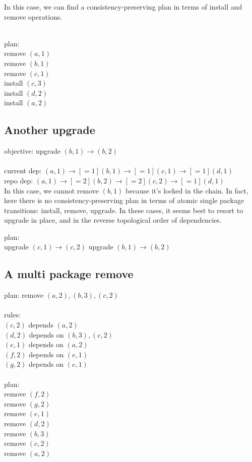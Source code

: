 \documentclass[a4paper,11pt]{article}
\begin{document}
In this case, we can find a consistency-preserving plan in terms of
install and remove operations.

\\
plan:\\
  remove $(a,1)$\\
  remove $(b,1)$\\
  remove $(c,1)$\\
  install $(c,3)$\\
  install $(d,2)$\\
  install $(a,2)$\\

\subsection{Another upgrade}

objective: upgrade $(b,1) \to (b,2)$\\
\\
current dep: $(a,1) \to[=1] (b,1) \to[=1] (c,1) \to[=1] (d,1)$\\
repo dep: \nobreakspace{} \nobreakspace$(a,1) \to[=2] (b,2) \to[=2] (c,2) \to[=1] (d,1)$\\

In this case, we cannot remove $(b,1)$ because it's locked in the
chain. In fact, here there is no consistency-preserving plan in terms
of atomic single package transitions: install, remove, upgrade. In
these cases, it seems best to resort to upgrade in place, and in the
reverse topological order of dependencies.

plan:\\
 upgrade $(c,1) \to (c,2)$
 upgrade $(b,1) \to (b,2)$


\subsection{A multi package remove}

plan: remove $(a,2), (b,3), (c,2)$\\
\\
rules:\\
  $(c,2)$ depends $(a,2)$\\
  $(d,2)$ depends on $(b,3), (c,2)$\\
  $(e,1)$ depends on $(a,2)$\\
  $(f,2)$ depends on $(e,1)$\\
  $(g,2)$ depends on $(e,1)$\\\\
plan:\\
  remove $(f,2)$\\
  remove $(g,2)$\\
  remove $(e,1)$\\
  remove $(d,2)$\\
  remove $(b,3)$\\
  remove $(c,2)$\\
  remove $(a,2)$\\
\end{document}
